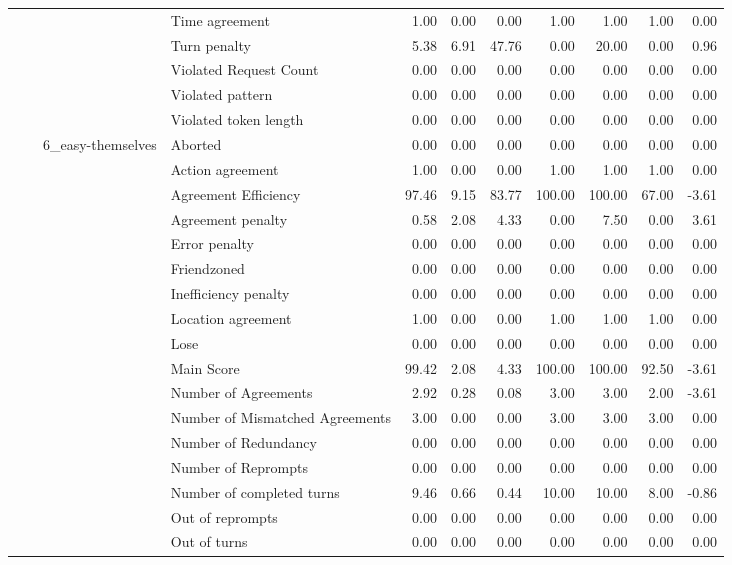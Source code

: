 \begin{tabular}{llllrrrrrrr}
 &  &  & Time agreement & 1.00 & 0.00 & 0.00 & 1.00 & 1.00 & 1.00 & 0.00 \\
 &  &  & Turn penalty & 5.38 & 6.91 & 47.76 & 0.00 & 20.00 & 0.00 & 0.96 \\
 &  &  & Violated Request Count & 0.00 & 0.00 & 0.00 & 0.00 & 0.00 & 0.00 & 0.00 \\
 &  &  & Violated pattern & 0.00 & 0.00 & 0.00 & 0.00 & 0.00 & 0.00 & 0.00 \\
 &  &  & Violated token length & 0.00 & 0.00 & 0.00 & 0.00 & 0.00 & 0.00 & 0.00 \\
\cline{3-11}
 &  & \multirow[t]{27}{*}{6_easy-themselves} & Aborted & 0.00 & 0.00 & 0.00 & 0.00 & 0.00 & 0.00 & 0.00 \\
 &  &  & Action agreement & 1.00 & 0.00 & 0.00 & 1.00 & 1.00 & 1.00 & 0.00 \\
 &  &  & Agreement Efficiency & 97.46 & 9.15 & 83.77 & 100.00 & 100.00 & 67.00 & -3.61 \\
 &  &  & Agreement penalty & 0.58 & 2.08 & 4.33 & 0.00 & 7.50 & 0.00 & 3.61 \\
 &  &  & Error penalty & 0.00 & 0.00 & 0.00 & 0.00 & 0.00 & 0.00 & 0.00 \\
 &  &  & Friendzoned & 0.00 & 0.00 & 0.00 & 0.00 & 0.00 & 0.00 & 0.00 \\
 &  &  & Inefficiency penalty & 0.00 & 0.00 & 0.00 & 0.00 & 0.00 & 0.00 & 0.00 \\
 &  &  & Location agreement & 1.00 & 0.00 & 0.00 & 1.00 & 1.00 & 1.00 & 0.00 \\
 &  &  & Lose & 0.00 & 0.00 & 0.00 & 0.00 & 0.00 & 0.00 & 0.00 \\
 &  &  & Main Score & 99.42 & 2.08 & 4.33 & 100.00 & 100.00 & 92.50 & -3.61 \\
 &  &  & Number of Agreements & 2.92 & 0.28 & 0.08 & 3.00 & 3.00 & 2.00 & -3.61 \\
 &  &  & Number of Mismatched Agreements & 3.00 & 0.00 & 0.00 & 3.00 & 3.00 & 3.00 & 0.00 \\
 &  &  & Number of Redundancy & 0.00 & 0.00 & 0.00 & 0.00 & 0.00 & 0.00 & 0.00 \\
 &  &  & Number of Reprompts & 0.00 & 0.00 & 0.00 & 0.00 & 0.00 & 0.00 & 0.00 \\
 &  &  & Number of completed turns & 9.46 & 0.66 & 0.44 & 10.00 & 10.00 & 8.00 & -0.86 \\
 &  &  & Out of reprompts & 0.00 & 0.00 & 0.00 & 0.00 & 0.00 & 0.00 & 0.00 \\
 &  &  & Out of turns & 0.00 & 0.00 & 0.00 & 0.00 & 0.00 & 0.00 & 0.00 \\

\end{tabular}
